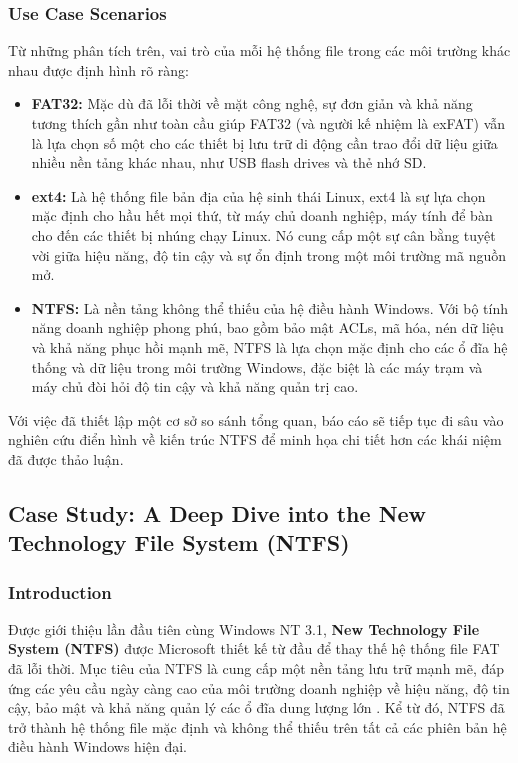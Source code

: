\documentclass[12pt]{article}
\begin{document}
\subsubsection{Use Case Scenarios}
Từ những phân tích trên, vai trò của mỗi hệ thống file trong các môi trường khác nhau được định hình rõ ràng:
\begin{itemize}
    \item \textbf{FAT32:} Mặc dù đã lỗi thời về mặt công nghệ, sự đơn giản và khả năng tương thích gần như toàn cầu giúp FAT32 (và người kế nhiệm là exFAT) vẫn là lựa chọn số một cho các thiết bị lưu trữ di động cần trao đổi dữ liệu giữa nhiều nền tảng khác nhau, như USB flash drives và thẻ nhớ SD.

    \item \textbf{ext4:} Là hệ thống file bản địa của hệ sinh thái Linux, ext4 là sự lựa chọn mặc định cho hầu hết mọi thứ, từ máy chủ doanh nghiệp, máy tính để bàn cho đến các thiết bị nhúng chạy Linux. Nó cung cấp một sự cân bằng tuyệt vời giữa hiệu năng, độ tin cậy và sự ổn định trong một môi trường mã nguồn mở.

    \item \textbf{NTFS:} Là nền tảng không thể thiếu của hệ điều hành Windows. Với bộ tính năng doanh nghiệp phong phú, bao gồm bảo mật ACLs, mã hóa, nén dữ liệu và khả năng phục hồi mạnh mẽ, NTFS là lựa chọn mặc định cho các ổ đĩa hệ thống và dữ liệu trong môi trường Windows, đặc biệt là các máy trạm và máy chủ đòi hỏi độ tin cậy và khả năng quản trị cao.
\end{itemize}

Với việc đã thiết lập một cơ sở so sánh tổng quan, báo cáo sẽ tiếp tục đi sâu vào nghiên cứu điển hình về kiến trúc NTFS để minh họa chi tiết hơn các khái niệm đã được thảo luận.



\subsection{Case Study: A Deep Dive into the New Technology File System (NTFS)}

\subsubsection{Introduction}
Được giới thiệu lần đầu tiên cùng Windows NT 3.1, \textbf{New Technology File System (NTFS)} được Microsoft thiết kế từ đầu để thay thế hệ thống file FAT đã lỗi thời. Mục tiêu của NTFS là cung cấp một nền tảng lưu trữ mạnh mẽ, đáp ứng các yêu cầu ngày càng cao của môi trường doanh nghiệp về hiệu năng, độ tin cậy, bảo mật và khả năng quản lý các ổ đĩa dung lượng lớn \parencite{Shafiei2012}. Kể từ đó, NTFS đã trở thành hệ thống file mặc định và không thể thiếu trên tất cả các phiên bản hệ điều hành Windows hiện đại.
\end{document}
